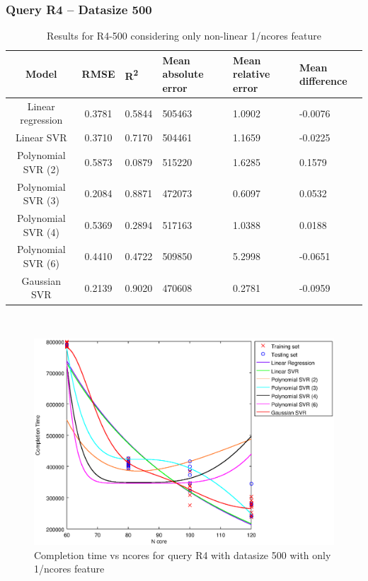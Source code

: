 \documentclass[a4paper,11pt]{article}
\begin{document}
\newpage
\subsubsection{Query R4 -- Datasize 500}
\begin{table}[H]
	\centering
	\begin{adjustbox}{center}
		\begin{tabular}{c | c M{1.2cm} M{2.5cm} M{2.5cm} M{1.8cm}}
			Model & RMSE & R\textsuperscript{2} & Mean absolute error & Mean relative error & Mean difference \tabularnewline
			\hline
			Linear regression & 0.3781 & 0.5844 & 505463 & 1.0902 & -0.0076 \\
			Linear SVR & 0.3710 & 0.7170 & 504461 & 1.1659 & -0.0225 \\
			Polynomial SVR (2) & 0.5873 & 0.0879 & 515220 & 1.6285 & 0.1579 \\
			Polynomial SVR (3) & 0.2084 & 0.8871 & 472073 & 0.6097 & 0.0532 \\
			Polynomial SVR (4) & 0.5369 & 0.2894 & 517163 & 1.0388 & 0.0188 \\
			Polynomial SVR (6) & 0.4410 & 0.4722 & 509850 & 5.2998 & -0.0651 \\
			Gaussian SVR & 0.2139 & 0.9020 & 470608 & 0.2781 & -0.0959 \\
		\end{tabular}
	\end{adjustbox}
	\\
	\caption{Results for R4-500 considering only non-linear 1/ncores feature}
	\label{table_R4_prediction_all}
\end{table}

\begin {figure}[hbtp]
\centering
\includegraphics[width=\textwidth]{output/R4_500_ONLY_1_OVER_NCORES/plot_R4_500.eps}
\caption {Completion time vs ncores for query R4 with datasize 500 with only 1/ncores feature}
\end {figure}
\end{document}
